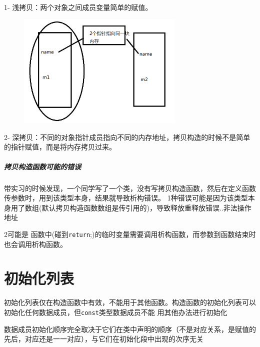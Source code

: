 \documentclass[UTF8,a4paper,12pt]{ctexbook} %
\begin{document}
		       1- 浅拷贝：两个对象之间成员变量简单的赋值。
		       
		       \begin{figure}[H]
		       	   \centering
		       	   \includegraphics[width=8cm,clip]{weakCopy.png}
		       \end{figure}
		       
		       2- 深拷贝：不同的对象指针成员指向不同的内存地址，拷贝构造的时候不是简单的指针赋值，而是将内存拷贝过来。
		       
		       \subparagraph{拷贝构造函数可能的错误}
				     带实习的时候发现，一个同学写了一个类，没有写拷贝构造函数，然后在定义函数传参数时，用到该类型本身，结果就导致析构错误。 1种错误可能是因为该类型本身用了数组(默认拷贝构造函数数组是传引用的)，导致释放重释放错误..非法操作地址
				     
				     2可能是 函数中(碰到\verb|return|;)的临时变量需要调用析构函数，而参数到函数结束时也会调用析构函数。
		       
\section{初始化列表}
	       
		       初始化列表仅在构造函数中有效，不能用于其他函数。构造函数的初始化列表可以初始化任何数据成员，但\verb|const|类型数据成员不能 用其他办法进行初始化
		       
		       数据成员初始化顺序完全取决于它们在类中声明的顺序（不是对应关系，是赋值的先后，对应还是一一对应），与它们在初始化段中出现的次序无关
		       
	       
\end{document}
